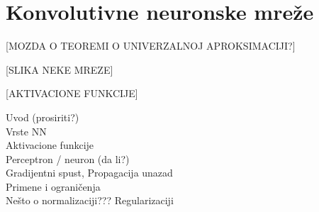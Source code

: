 \section{Konvolutivne neuronske mreže}





[MOZDA O TEOREMI O UNIVERZALNOJ APROKSIMACIJI?]

[SLIKA NEKE MREZE]



[AKTIVACIONE FUNKCIJE]

Uvod  (prosiriti?) \\
Vrste NN \\
Aktivacione funkcije \\
Perceptron / neuron (da li?) \\
Gradijentni spust, Propagacija unazad \\
Primene i ograničenja \\
Nešto o normalizaciji??? Regularizaciji